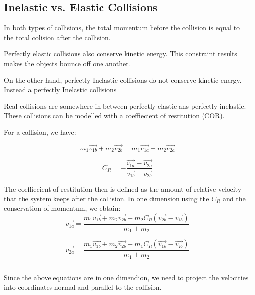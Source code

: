 \documentclass{article}
\begin{document}
\subsection*{Inelastic vs. Elastic Collisions}

In both types of collisions, the total momentum before the collision is equal to the total colision after the collision.

Perfectly elastic collisions also conserve kinetic energy. This constraint results makes the objects bounce off one another.

On the other hand, perfectly Inelastic collisions do not conserve kinetic energy. Instead a perfectly Inelastic collisions 


Real collisions are somewhere in between perfectly elastic ans perfectly inelastic.
These collisions can be modelled with a coeffiecient of restitution (COR).

For a collision, we have:

\begin{equation}
    m_{1}\overrightarrow{v_{1b}} + m_{2}\overrightarrow{v_{2b}} = m_{1}\overrightarrow{v_{1a}} + m_{2}\overrightarrow{v_{2a}}
\end{equation}

\begin{equation}
    C_{R} =  -\frac{\overrightarrow{v_{1a}} - \overrightarrow{v_{2a}}}{\overrightarrow{v_{1b}} - \overrightarrow{v_{2b}}}
\end{equation}

The coeffiecient of restitution then is defined as the amount of relative velocity that the system keeps after the collision.
In one dimension using the $C_R$ and the conservation of momentum, we obtain:
\begin{equation}
    \overrightarrow{v_{1a}} =  \frac{m_1\overrightarrow{v_{1b}} + m_2\overrightarrow{v_{2b}} + m_2C_R(\overrightarrow{v_{2b}} - \overrightarrow{v_{1b}})}{m_1 + m_2}
\end{equation}

\begin{equation}
    \overrightarrow{v_{2a}} =  \frac{m_1\overrightarrow{v_{1b}} + m_2\overrightarrow{v_{2b}} + m_1C_R(\overrightarrow{v_{1b}} - \overrightarrow{v_{2b}})}{m_1 + m_2}
\end{equation}

\vspace{5pt}
\hrule
\vspace{5pt}

Since the above equations are in one dimendion, we need to project the velocities into coordinates normal and parallel to the collision.
\end{document}
